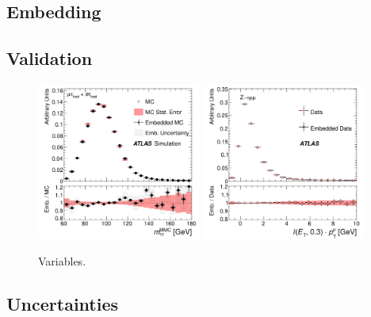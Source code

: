 \subsection{Embedding}

\subsection{Validation}

\begin{figure}[tp]
  \centering
  \includegraphics[width=0.48\textwidth]{figures/HIGG-2013-32/fig_03b}
  \includegraphics[width=0.48\textwidth]{figures/HIGG-2013-32/fig_03a}
  \caption{Variables.}
  \label{fig:backgrounds-embedding-validation}
\end{figure}

\clearpage

\subsection{Uncertainties}

